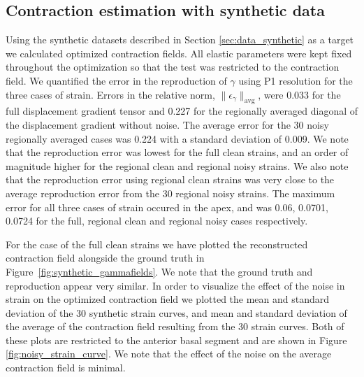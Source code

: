 \subsection{Contraction estimation with synthetic data}
\label{sec:results_synthetic}
Using the synthetic datasets described in Section \ref{sec:data_synthetic} as a target we 
calculated optimized contraction fields. All elastic parameters 
were kept fixed throughout the optimization so that the test was restricted to
the contraction field.
We quantified the error in the reproduction of $\gamma$ using P1
resolution for the three cases of strain. Errors in the relative norm, $\| \epsilon_{\gamma} \|_{\text{avg}}$,
were 0.033 for the full displacement gradient tensor and 0.227 for the 
regionally averaged diagonal of the displacement gradient without noise. The average error
for the 30 noisy regionally averaged cases was 0.224 with a standard deviation of 0.009.
We note that the reproduction error was lowest for the full clean strains, 
and an order of magnitude higher
for the regional clean and regional noisy strains. We also note that the 
reproduction error using regional clean strains was very
close to the average reproduction error from the 30 regional noisy strains.
The maximum error for all three cases of strain occured in the apex, 
and was 0.06, 0.0701, 0.0724 for the full, regional clean and regional noisy cases
respectively.



For the case of the full clean strains we have plotted the 
reconstructed contraction field alongside the ground truth in
Figure~\ref{fig:synthetic_gammafields}. 
We note that the ground truth and reproduction appear very similar. In
order to visualize the effect of the  
noise in strain on the optimized contraction field we
plotted the mean and standard deviation of the 30 synthetic strain curves,
and mean and standard deviation of the average of the contraction field 
resulting from the 30 strain curves. Both of these plots are
restricted to the anterior basal segment and are shown in Figure
\ref{fig:noisy_strain_curve}. We note that the effect of the noise on
the average contraction field is minimal.


